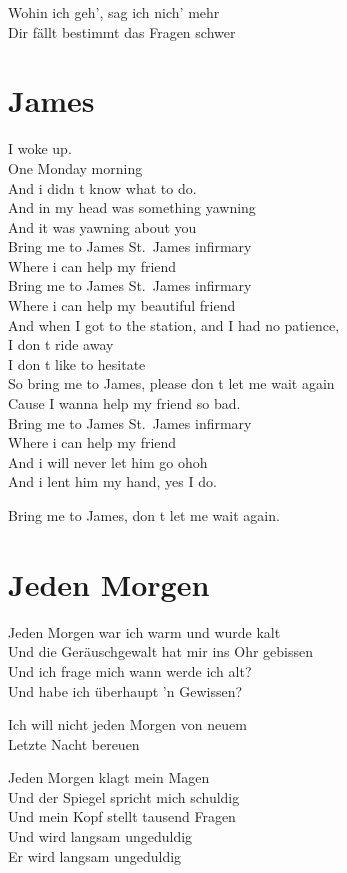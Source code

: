 \documentclass[]{book}
\begin{document}
Wohin ich geh', sag ich nich' mehr\\
Dir fällt bestimmt das Fragen schwer

\hypertarget{james-2}{%
\section{James}\label{james-2}}

I woke up.\\
One Monday morning\\
And i didn t know what to do.\\
And in my head was something yawning\\
And it was yawning about you\\
Bring me to James St.~James infirmary\\
Where i can help my friend\\
Bring me to James St.~James infirmary\\
Where i can help my beautiful friend\\
And when I got to the station, and I had no patience,\\
I don t ride away\\
I don t like to hesitate\\
So bring me to James, please don t let me wait again\\
Cause I wanna help my friend so bad.\\
Bring me to James St.~James infirmary\\
Where i can help my friend\\
And i will never let him go ohoh\\
And i lent him my hand, yes I do.

Bring me to James, don t let me wait again.

\hypertarget{jeden-morgen-2}{%
\section{Jeden Morgen}\label{jeden-morgen-2}}

Jeden Morgen war ich warm und wurde kalt\\
Und die Geräuschgewalt hat mir ins Ohr gebissen\\
Und ich frage mich wann werde ich alt?\\
Und habe ich überhaupt 'n Gewissen?

Ich will nicht jeden Morgen von neuem\\
Letzte Nacht bereuen

Jeden Morgen klagt mein Magen\\
Und der Spiegel spricht mich schuldig\\
Und mein Kopf stellt tausend Fragen\\
Und wird langsam ungeduldig\\
Er wird langsam ungeduldig
\end{document}
